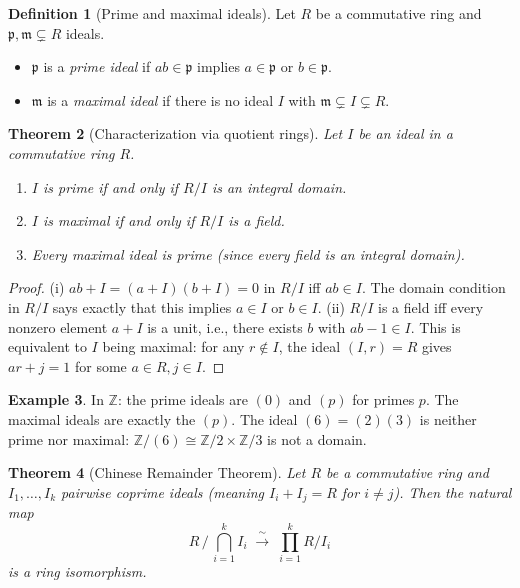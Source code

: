 \documentclass[12pt,a4paper]{amsart}
\newtheorem{theorem}{Theorem}[section]
\theoremstyle{definition}
\newtheorem{definition}[theorem]{Definition}
\newtheorem{example}[theorem]{Example}
\theoremstyle{definition}
\begin{document}
\begin{definition}[Prime and maximal ideals]
Let $R$ be a commutative ring and $\mathfrak{p}, \mathfrak{m} \subsetneq R$ ideals.
\begin{itemize}
  \item $\mathfrak{p}$ is a \emph{prime ideal} if $ab \in \mathfrak{p}$ implies
        $a \in \mathfrak{p}$ or $b \in \mathfrak{p}$.
  \item $\mathfrak{m}$ is a \emph{maximal ideal} if there is no ideal $I$ with
        $\mathfrak{m} \subsetneq I \subsetneq R$.
\end{itemize}
\end{definition}

\begin{theorem}[Characterization via quotient rings]
Let $I$ be an ideal in a commutative ring $R$.
\begin{enumerate}[label=(\roman*)]
  \item $I$ is prime if and only if $R/I$ is an integral domain.
  \item $I$ is maximal if and only if $R/I$ is a field.
  \item Every maximal ideal is prime (since every field is an integral domain).
\end{enumerate}
\end{theorem}

\begin{proof}
(i) $ab + I = (a+I)(b+I) = 0$ in $R/I$ iff $ab \in I$. The domain condition in $R/I$
says exactly that this implies $a \in I$ or $b \in I$.
(ii) $R/I$ is a field iff every nonzero element $a + I$ is a unit, i.e., there exists
$b$ with $ab - 1 \in I$. This is equivalent to $I$ being maximal: for any $r \notin I$,
the ideal $(I,r) = R$ gives $ar + j = 1$ for some $a \in R, j \in I$.
\end{proof}

\begin{example}\label{ex:ideals-Z}
In $\mathbb{Z}$: the prime ideals are $(0)$ and $(p)$ for primes $p$.
The maximal ideals are exactly the $(p)$. The ideal $(6) = (2)(3)$ is neither prime
nor maximal: $\mathbb{Z}/(6) \cong \mathbb{Z}/2 \times \mathbb{Z}/3$ is not a domain.
\end{example}

\begin{theorem}[Chinese Remainder Theorem]\label{thm:crt}
Let $R$ be a commutative ring and $I_1,\ldots,I_k$ pairwise coprime ideals
(meaning $I_i + I_j = R$ for $i \neq j$). Then the natural map
\[
  R \,\Big/\, \bigcap_{i=1}^k I_i \;\xrightarrow{\;\sim\;}\; \prod_{i=1}^k R/I_i
\]
is a ring isomorphism.
\end{theorem}
\end{document}
